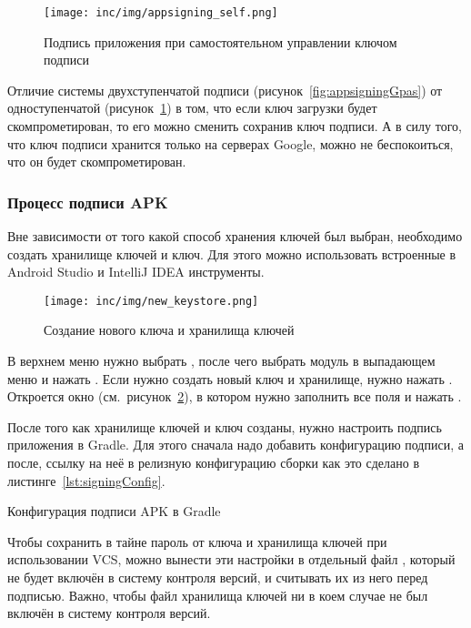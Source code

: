 \begin{figure}[ht]
  \texttt{[image: inc/img/appsigning\_self.png]}
  \caption{Подпись приложения при самостоятельном управлении ключом подписи}
  \label{fig:appsigningSelf}
\end{figure}

Отличие системы двухступенчатой подписи (рисунок~\ref{fig:appsigningGpas}) от одноступенчатой (рисунок~\ref{fig:appsigningSelf}) в том, что если ключ загрузки будет скомпрометирован, то его можно сменить сохранив ключ подписи.
А в силу того, что ключ подписи хранится только на серверах Google, можно не беспокоиться, что он будет скомпрометирован.

\subsubsection*{Процесс подписи APK}

Вне зависимости от того какой способ хранения ключей был выбран, необходимо создать хранилище ключей и ключ.
Для этого можно использовать встроенные в Android Studio и IntelliJ IDEA инструменты.

\begin{figure}[ht]
  \centering
  \texttt{[image: inc/img/new\_keystore.png]}
  \caption{Создание нового ключа и хранилища ключей}
  \label{fig:newKeystore}
\end{figure}

В верхнем меню нужно выбрать , после чего выбрать модуль в выпадающем меню и нажать .
Если нужно создать новый ключ и хранилище, нужно нажать .
Откроется окно  (см.~рисунок~\ref{fig:newKeystore}), в котором нужно заполнить все поля и нажать .

После того как хранилище ключей и ключ созданы, нужно настроить подпись приложения в Gradle.
Для этого сначала надо добавить конфигурацию подписи, а после, ссылку на неё в релизную конфигурацию сборки как это сделано в листинге~\ref{lst:signingConfig}.

\begin{listing}[h]
  \caption{Конфигурация подписи APK в Gradle}
  \label{lst:signingConfig}
\end{listing}

Чтобы сохранить в тайне пароль от ключа и хранилища ключей при использовании VCS, можно вынести эти настройки в отдельный файл , который не будет включён в систему контроля версий, и считывать их из него перед подписью.
Важно, чтобы файл хранилища ключей ни в коем случае не был включён в систему контроля версий.

